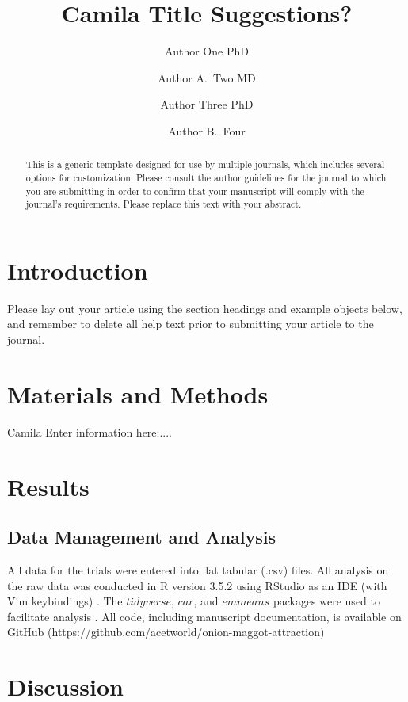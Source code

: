 \documentclass[alpha-refs]{wiley-article}
\title{Camila Title Suggestions?}
\author[1\authfn{1}]{Author One PhD}
\author[2\authfn{1}]{Author A.~Two MD}
\author[2\authfn{2}]{Author Three PhD}
\author[2]{Author B.~Four}
\affil[1]{Department, Institution, City, State or Province, Postal Code, Country}
\affil[2]{Department, Institution, City, State or Province, Postal Code, Country}
\begin{document}
\maketitle

\begin{abstract}
This is a generic template designed for use by multiple journals, which includes several options for customization. Please consult the author guidelines for the journal to which you are submitting in order to confirm that your manuscript will comply with the journal's requirements. Please replace this text with your abstract.

\end{abstract}

\section{Introduction}
Please lay out your article using the section headings and example objects below, and remember to delete all help text prior to submitting your article to the journal.


\section{Materials and Methods}

Camila Enter information here:....


\section{Results}


\subsection{Data Management and Analysis}

All data for the trials were entered into flat tabular (.csv) files.  All analysis on the raw data was conducted in R version 3.5.2 using RStudio as an IDE (with Vim keybindings) \citep{rcore2018,rstudio}.  The $tidyverse$, $car$, and $emmeans$ packages were used to facilitate analysis \citep{tidy, car, emmeans}.  All code, including manuscript documentation, is available on GitHub (https://github.com/acetworld/onion-maggot-attraction) 

\section{Discussion}
\end{document}
